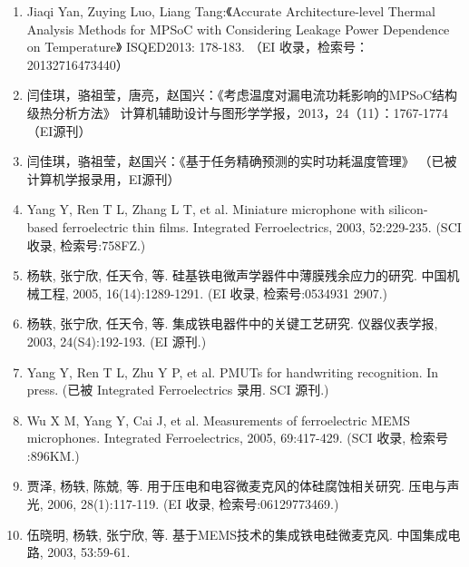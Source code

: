 \begin{paper}
\begin{enumerate}
	

	\item Jiaqi Yan, Zuying Luo, Liang Tang:《Accurate Architecture-level Thermal Analysis Methods for MPSoC with Considering Leakage Power Dependence on Temperature》 ISQED2013: 178-183. （EI 收录，检索号：20132716473440）
	\item 闫佳琪，骆祖莹，唐亮，赵国兴：《考虑温度对漏电流功耗影响的MPSoC结构级热分析方法》 计算机辅助设计与图形学学报，2013，24（11）：1767-1774 （EI源刊）
	\item 闫佳琪，骆祖莹，赵国兴：《基于任务精确预测的实时功耗温度管理》 （已被计算机学报录用，EI源刊）

\item Yang Y, Ren T L, Zhang L T, et al. Miniature microphone with silicon-
    based ferroelectric thin films. Integrated Ferroelectrics, 2003,
    52:229-235. (SCI 收录, 检索号:758FZ.)
\item 杨轶, 张宁欣, 任天令, 等. 硅基铁电微声学器件中薄膜残余应力的研究. 中国机
    械工程, 2005, 16(14):1289-1291. (EI 收录, 检索号:0534931 2907.)
\item 杨轶, 张宁欣, 任天令, 等. 集成铁电器件中的关键工艺研究. 仪器仪表学报,
    2003, 24(S4):192-193. (EI 源刊.)
\item Yang Y, Ren T L, Zhu Y P, et al. PMUTs for handwriting recognition. In
    press. (已被 Integrated Ferroelectrics 录用. SCI 源刊.)
\item Wu X M, Yang Y, Cai J, et al. Measurements of ferroelectric MEMS
    microphones. Integrated Ferroelectrics, 2005, 69:417-429. (SCI 收录, 检索号
    :896KM.)
\item 贾泽, 杨轶, 陈兢, 等. 用于压电和电容微麦克风的体硅腐蚀相关研究. 压电与声
    光, 2006, 28(1):117-119. (EI 收录, 检索号:06129773469.)
\item 伍晓明, 杨轶, 张宁欣, 等. 基于MEMS技术的集成铁电硅微麦克风. 中国集成电路,
    2003, 53:59-61.
    
    
  \end{enumerate}

\end{paper}
